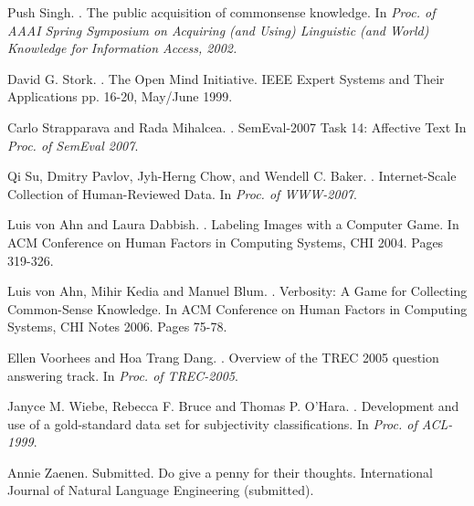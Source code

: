 \documentclass[11pt]{article}
\begin{document}
\begin{thebibliography}{}

Push Singh.
. 
\newblock The public acquisition of commonsense knowledge.
\newblock In \textit{Proc. of AAAI Spring Symposium on Acquiring (and Using) Linguistic (and World) Knowledge for Information Access, 2002.}

David G. Stork.
. 
\newblock The Open Mind Initiative.
\newblock IEEE Expert Systems and Their Applications pp. 16-20, May/June 1999.

Carlo Strapparava and Rada Mihalcea.
.
\newblock SemEval-2007 Task 14: Affective Text
\newblock In \textit{Proc. of SemEval 2007}.

Qi Su, Dmitry Pavlov, Jyh-Herng Chow, and Wendell C. Baker.
.
\newblock Internet-Scale Collection of Human-Reviewed Data. 
\newblock In \textit{Proc. of WWW-2007}.

Luis von Ahn and Laura Dabbish.
.
\newblock Labeling Images with a Computer Game.
\newblock In ACM Conference on Human Factors in Computing Systems, CHI 2004. Pages 319-326. 

Luis von Ahn, Mihir Kedia and Manuel Blum. 
.
\newblock Verbosity: A Game for Collecting Common-Sense Knowledge. 
\newblock In ACM Conference on Human Factors in Computing Systems, CHI Notes 2006. Pages 75-78. 

Ellen Voorhees and Hoa Trang Dang.
.
\newblock Overview of the TREC 2005 question answering track.
\newblock In \textit{ Proc. of TREC-2005}.

Janyce M. Wiebe, Rebecca F. Bruce and Thomas P. O'Hara.
.
\newblock Development and use of a gold-standard data set for subjectivity classifications.
\newblock In \textit{Proc. of ACL-1999}.

Annie Zaenen. 
\newblock Submitted.  %
\newblock Do give a penny for their thoughts.
\newblock International Journal of Natural Language Engineering (submitted).

\end{thebibliography}
\end{document}
